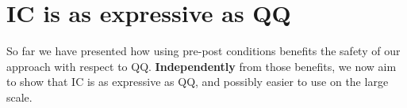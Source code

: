 %
%
%
%
%
%







\section{IC is as expressive as QQ}
So far we have presented how using pre-post conditions benefits the safety of our approach 
with respect to QQ.
\textbf{Independently} from those benefits, 
we now aim to show that IC is as expressive as QQ, and possibly easier to use on the large scale.

